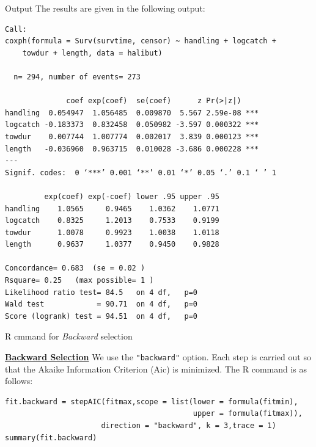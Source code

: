 \documentclass[envcountsect, 10pt, portrait, palatino]{beamer}
\begin{document}
\begin{frame}[fragile]{Output}
The results are given in the following output:

\scriptsize
\begin{verbatim}
Call:
coxph(formula = Surv(survtime, censor) ~ handling + logcatch +
    towdur + length, data = halibut)

  n= 294, number of events= 273

              coef exp(coef)  se(coef)      z Pr(>|z|)
handling  0.054947  1.056485  0.009870  5.567 2.59e-08 ***
logcatch -0.183373  0.832458  0.050982 -3.597 0.000322 ***
towdur    0.007744  1.007774  0.002017  3.839 0.000123 ***
length   -0.036960  0.963715  0.010028 -3.686 0.000228 ***
---
Signif. codes:  0 ‘***’ 0.001 ‘**’ 0.01 ‘*’ 0.05 ‘.’ 0.1 ‘ ’ 1

         exp(coef) exp(-coef) lower .95 upper .95
handling    1.0565     0.9465    1.0362    1.0771
logcatch    0.8325     1.2013    0.7533    0.9199
towdur      1.0078     0.9923    1.0038    1.0118
length      0.9637     1.0377    0.9450    0.9828

Concordance= 0.683  (se = 0.02 )
Rsquare= 0.25   (max possible= 1 )
Likelihood ratio test= 84.5   on 4 df,   p=0
Wald test            = 90.71  on 4 df,   p=0
Score (logrank) test = 94.51  on 4 df,   p=0

\end{verbatim}
\end{frame}
\begin{frame}[fragile]{R cmmand for \textit{Backward} selection}

\underline{\bf Backward Selection}
We use the {\tt "backward"} option. Each step is carried out so that the Akaike Information Criterion (Aic) is minimized.  The R command is as follows:

\small
\begin{verbatim}
fit.backward = stepAIC(fitmax,scope = list(lower = formula(fitmin),
                                           upper = formula(fitmax)),
                      direction = "backward", k = 3,trace = 1)
summary(fit.backward)

\end{verbatim}
\end{frame}
\end{document}
